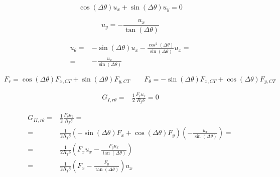 \documentclass[a4paper]{jpconf}
\begin{document}
\begin{equation}
\cos\left(\Delta\theta\right) u_{x}+\sin\left(\Delta\theta\right) u_{y}=0
\end{equation}

\begin{equation}
u_{y}=-\frac{ u_{x}}{\tan\left(\Delta\theta\right)}
\end{equation}

\begin{equation}
\begin{split}
u_{\theta}=&-\sin\left(\Delta\theta\right) u_{x}-\frac{\cos^{2}\left(\Delta\theta\right)}{\sin\left(\Delta\theta\right)}u_{x}=\\
=&-\frac{u_{x}}{\sin\left(\Delta\theta\right)}
\end{split}
\end{equation}

\begin{equation}
F_{r}=\cos\left(\Delta\theta\right) F_{x,CT}+\sin\left(\Delta\theta\right) F_{y,CT}\qquad F_{\theta}=-\sin\left(\Delta\theta\right) F_{x,CT}+\cos\left(\Delta\theta\right) F_{y,CT}
\end{equation}

\begin{equation}
\begin{split}
G_{I,r\theta} = &\frac{1}{2}\frac{F_{r}u_{r}}{R_{f}\delta}=0
\end{split}
\end{equation}

\begin{equation}
\begin{split}
G_{II,r\theta} = &\frac{1}{2}\frac{F_{\theta}u_{\theta}}{R_{f}\delta}=\\
= &\frac{1}{2R_{f}\delta}\left(-\sin\left(\Delta\theta\right) F_{x}+\cos\left(\Delta\theta\right)F_{y}\right)\left(-\frac{u_{x}}{\sin\left(\Delta\theta\right)}\right)=\\
= &\frac{1}{2R_{f}\delta}\left( F_{x}u_{x}-\frac{F_{y}u_{x}}{\tan\left(\Delta\theta\right)}\right)\\
= &\frac{1}{2R_{f}\delta}\left( F_{x}-\frac{F_{y}}{\tan\left(\Delta\theta\right)}\right)u_{x}\\
\end{split}
\end{equation}

\clearpage

\end{document}
